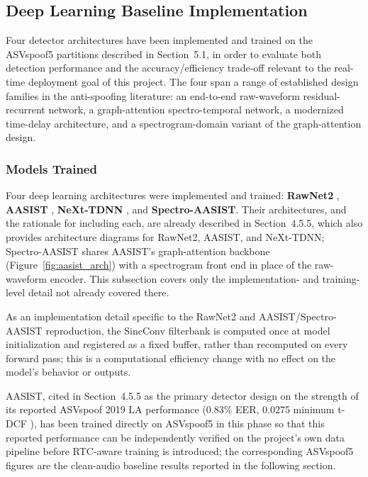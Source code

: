 \subsection{Deep Learning Baseline Implementation}

Four detector architectures have been implemented and trained on the ASVspoof5 partitions described in Section~5.1, in order to evaluate both detection performance and the accuracy/efficiency trade-off relevant to the real-time deployment goal of this project. The four span a range of established design families in the anti-spoofing literature: an end-to-end raw-waveform residual-recurrent network, a graph-attention spectro-temporal network, a modernized time-delay architecture, and a spectrogram-domain variant of the graph-attention design.

\subsubsection{Models Trained}

Four deep learning architectures were implemented and trained: \textbf{RawNet2} \cite{Tak2021_rawnet2}, \textbf{AASIST} \cite{Jung2022_aasist}, \textbf{NeXt-TDNN} \cite{Heo2024_nexttdnn}, and \textbf{Spectro-AASIST}. Their architectures, and the rationale for including each, are already described in Section~4.5.5, which also provides architecture diagrams for RawNet2, AASIST, and NeXt-TDNN; Spectro-AASIST shares AASIST's graph-attention backbone (Figure~\ref{fig:aasist_arch}) with a spectrogram front end in place of the raw-waveform encoder. This subsection covers only the implementation- and training-level detail not already covered there.

As an implementation detail specific to the RawNet2 and AASIST/Spectro-AASIST reproduction, the SincConv filterbank is computed once at model initialization and registered as a fixed buffer, rather than recomputed on every forward pass; this is a computational efficiency change with no effect on the model's behavior or outputs.

AASIST, cited in Section~4.5.5 as the primary detector design on the strength of its reported ASVspoof 2019 LA performance (0.83\% EER, 0.0275 minimum t-DCF \cite{Jung2022_aasist}), has been trained directly on ASVspoof5 in this phase so that this reported performance can be independently verified on the project's own data pipeline before RTC-aware training is introduced; the corresponding ASVspoof5 figures are the clean-audio baseline results reported in the following section.

